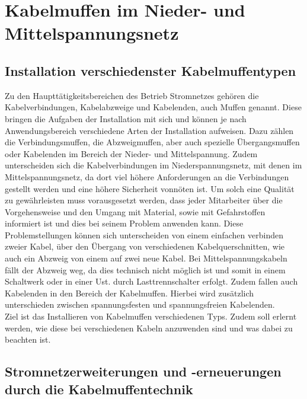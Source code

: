 \iffalse

\chapter{Kabelmuffen im Nieder- und Mittelspannungsnetz}
\label{cha:Kabelmuffen}

\section{Installation verschiedenster Kabelmuffentypen}

Zu den Haupttätigkeitsbereichen des Betrieb Stromnetzes gehören die Kabelverbindungen, Kabelabzweige und Kabelenden, auch Muffen genannt. Diese bringen die 
Aufgaben der Installation mit sich und können je nach Anwendungsbereich verschiedene Arten der Installation aufweisen. Dazu zählen \zB die Verbindungsmuffen, 
die Abzweigmuffen, aber auch spezielle Übergangsmuffen oder Kabelenden im Bereich der Nieder- und Mittelspannung. Zudem unterscheiden sich die 
Kabelverbindungen im Niederspannungsnetz, mit denen im Mittelspannungsnetz, da dort viel höhere Anforderungen an die Verbindungen gestellt werden und eine 
höhere Sicherheit vonnöten ist. Um solch eine Qualität zu gewährleisten muss vorausgesetzt werden, dass jeder Mitarbeiter über die Vorgehensweise und den 
Umgang mit Material, sowie mit Gefahrstoffen informiert ist und dies bei seinem Problem anwenden kann. Diese Problemstellungen können sich unterscheiden von 
einem einfachen verbinden zweier Kabel, über den Übergang von verschiedenen Kabelquerschnitten, wie auch ein Abzweig von einem auf zwei neue Kabel. Bei 
Mittelspannungskabeln fällt der Abzweig weg, da dies technisch nicht möglich ist und somit in einem Schaltwerk oder in einer Ust. durch Lasttrennschalter 
erfolgt. Zudem fallen auch Kabelenden in den Bereich der Kabelmuffen. Hierbei wird zusätzlich unterschieden zwischen spannungsfesten und spannungsfreien 
Kabelenden. 
\\
Ziel ist das Installieren von Kabelmuffen verschiedenen Typs. Zudem soll erlernt werden, wie diese bei verschiedenen Kabeln anzuwenden sind und was dabei 
zu beachten ist.

\section{Stromnetzerweiterungen und -erneuerungen durch die Kabelmuffentechnik}

